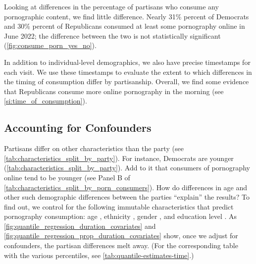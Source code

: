 \documentclass[12pt, letterpaper]{article}
\begin{document}
Looking at differences in the percentage of partisans who consume any pornographic content, we find little difference. Nearly 31\% percent of Democrats and 30\% percent of Republicans consumed at least some pornography online in June 2022; the difference between the two is not statistically significant (\cref{fig:consume_porn_yes_no}). 

In addition to individual-level demographics, we also have precise timestamps for each visit. We use these timestamps to evaluate the extent to which differences in the timing of consumption differ by partisanship. Overall, we find some evidence that Republicans consume more online pornography in the morning (see \cref{si:time_of_consumption}).

\subsection{Accounting for Confounders}

Partisans differ on other characteristics than the party (see \cref{tab:characteristics_split_by_party}). For instance, Democrats are younger (\cref{tab:characteristics_split_by_party}). Add to it that consumers of pornography online tend to be younger (see Panel B of \cref{tab:characteristics_split_by_porn_consumers}). How do differences in age and other such demographic differences between the parties ``explain'' the results? To find out, we control for the following immutable characteristics that predict pornography consumption: age \citep{Wright2013-an, Woodrum1992-vk}, ethnicity \citep{Wright2013-an}, gender \citep{Woodrum1992-vk}, and education level \citep{Woodrum1992-vk}. As \cref{fig:quantile_regression_duration_covariates} and \cref{fig:quantile_regression_prop_duration_covariates} show, once we adjust for confounders, the partisan differences melt away. (For the corresponding table with the various percentiles, see \cref{tab:quantile-estimates-time}.)
\end{document}
